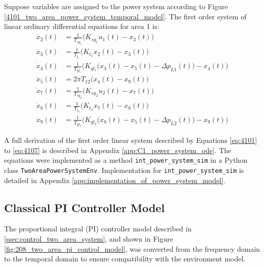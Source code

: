 Suppose variables are assigned to the power system according to Figure \ref{4101_two_area_power_system_temporal_model}. The first order system of linear ordinary differential equations for area 1 is:
\begin{align}
	\dot{x}_2(t) &= \frac{1}{T_{sg_1}}\big( K_{sg_1} u_1(t) - x_2(t) \big) \label{eq:4101} \\
	\dot{x}_3(t) &= \frac{1}{T_{t_1}} \big( K_{t_1} x_2(t) - x_3(t) \big) \label{eq:4102} \\
	\dot{x}_4(t) &= \frac{1}{T_{gl_1}} \bigg( K_{gl_1} \big( x_3(t) - x_5(t) - \Delta p_{L1}(t) \big) - x_4(t) \bigg) \label{eq:4103}  \\
	\dot{x}_5(t) &= 2 \pi T_{12} \big( x_4(t) - x_9(t) \big) \label{eq:4104} \\
	\dot{x}_7(t) &= \frac{1}{T_{sg_2}}\big( K_{sg_2} u_2(t) - x_7(t) \big) \label{eq:4105} \\
	\dot{x}_8(t) &= \frac{1}{T_{t_2}} \big( K_{t_2} x_7(t) - x_8(t) \big) \label{eq:4106} \\
	\dot{x}_9(t) &= \frac{1}{T_{gl_2}} \bigg( K_{gl_2} \big( x_8(t) - x_5(t) - \Delta p_{L2}(t) \big) - x_9(t) \bigg) \label{eq:4107}
\end{align}

A full derivation of the first order linear system described by Equations \ref{eq:4101} to \ref{eq:4107} is described in Appendix \ref{app:C1_power_system_ode}. The equations were implemented as a method \verb|int_power_system_sim| in a Python class \verb|TwoAreaPowerSystemEnv|. Implementation for \verb|int_power_system_sim| is detailed in Appendix \ref{app:implementation_of_power_system_model}.




\subsection{Classical PI Controller Model}
The proportional integral (PI) controller model described in \textsection \ref{ssec:control_two_area_system}, and shown in Figure \ref{fig:208_two_area_pi_control_model}, was converted from the frequency domain to the temporal domain to ensure compatibility with the environment model.

